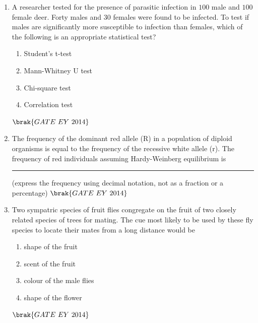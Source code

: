 \documentclass[journal]{IEEEtran}
\numberwithin{equation}{enumi}
\numberwithin{figure}{enumi}
\begin{document}
\begin{enumerate}
    \item A researcher tested for the presence of parasitic infection in $100$ male and $100$ female deer. Forty males and $30$ females were found to be infected. To test if males are significantly more susceptible to infection than females, which of the following is an appropriate statistical test?
    \begin{multicols}{2}
    \begin{enumerate}
        \item Student's t-test
        \item Mann-Whitney U test
        \item Chi-square test
        \item Correlation test
    \end{enumerate}
    \end{multicols}
    \hfill{$\brak{ GATE\ EY\ 2014}$}
    \bigskip

    \item The frequency of the dominant red allele (R) in a population of diploid organisms is equal to the frequency of the recessive white allele (r). The frequency of red individuals assuming Hardy-Weinberg equilibrium is \rule{3cm}{0.15mm} (express the frequency using decimal notation, not as a fraction or a percentage)
    \hfill{$\brak{ GATE\ EY\ 2014}$}
    \bigskip

    \item Two sympatric species of fruit flies congregate on the fruit of two closely related species of trees for mating. The cue most likely to be used by these fly species to locate their mates from a long distance would be
    \begin{multicols}{2}
    \begin{enumerate}
        \item shape of the fruit
        \item scent of the fruit
        \item colour of the male flies
        \item shape of the flower
    \end{enumerate}
    \end{multicols}
    \hfill{$\brak{ GATE\ EY\ 2014}$}
    \bigskip


\end{enumerate}
\end{document}
